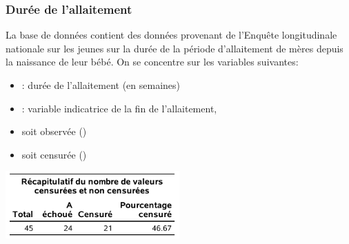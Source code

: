\documentclass{beamer}
\begin{document}
\begin{frame}
\frametitle{Durée de l'allaitement}
La base de données  contient des données provenant de l'Enquête longitudinale nationale sur les jeunes sur la durée de la période d'allaitement de mères depuis la naissance de leur bébé. On se concentre sur les variables suivantes:
\begin{itemize}
\item {}: durée de l'allaitement (en semaines)
\item {}: variable indicatrice de la fin de l'allaitement, 
\bi \item soit observée () 
\item soit censurée ()
\ei

\end{itemize}
\begin{center}
\includegraphics[width = 0.5\textwidth]{img/c7/diapos7e06}
\end{center}
% 
\end{frame}
\end{document}
